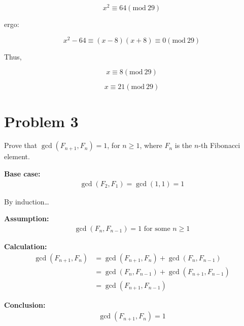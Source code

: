 \documentclass[11pt]{article}
\begin{document}
\begin{equation}
x^2 \equiv 64 (\text{mod} \ 29)
\end{equation}

ergo:

\begin{equation}
x^2 - 64 \equiv (x - 8)(x + 8) \equiv 0 (\text{mod} \ 29)
\end{equation}

Thus,

\begin{equation}
x \equiv 8 (\text{mod} \ 29)
\end{equation}

\begin{equation}
x \equiv 21 (\text{mod} \ 29)
\end{equation}
\pagebreak

\section*{Problem 3}

Prove that $\gcd(F_{n+1},F_n)=1$, for $n\ge1$, where $F_n$ is the $n$-th Fibonacci element.


\textbf{Base case:}
\begin{align*}
\gcd(F_2,F_1)=\gcd(1,1)=1
\end{align*}

By induction\dots

\textbf{Assumption:}
\begin{align*}
\gcd(F_n,F_{n-1})=1\text{ for some }n\ge1
\end{align*}

\textbf{Calculation:}
\begin{align*}
\gcd(F_{n+1},F_n) &= \gcd(F_{n+1},F_n)+\gcd(F_n,F_{n-1}) \\
&= \gcd(F_n,F_{n-1})+\gcd(F_{n+1},F_{n-1}) \\
&= \gcd(F_{n+1},F_{n-1})
\end{align*}

\textbf{Conclusion:}
\begin{align*}
\gcd(F_{n+1},F_n)=1
\end{align*}
\end{document}
